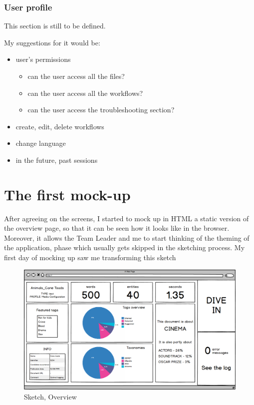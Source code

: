 \documentclass[12pt,svgnames]{memoir}
\begin{document}
\subsubsection*{User profile}\label{user-profile}

This section is still to be defined.

My suggestions for it would be:

\begin{itemize}
\itemsep1pt\parskip0pt
\item
  user's permissions

  \begin{itemize}
  \itemsep1pt\parskip0pt
  \item
    can the user access all the files?
  \item
    can the user access all the workflows?
  \item
    can the user access the troubleshooting section?
  \end{itemize}
\item
  create, edit, delete workflows
\item
  change language
\item
  in the future, past sessions
\end{itemize}

\section{The first mock-up}\label{the-first-mock-up}

After agreeing on the screens, I started to mock up in HTML a static
version of the overview page, so that it can be seen how it looks like
in the browser. Moreover, it allows the Team Leader and me to start
thinking of the theming of the application, phase which usually gets
skipped in the sketching process. My first day of mocking up saw me
transforming this sketch

\begin{figure}[htbp]
\centering
\includegraphics{./src/img/sketch-overview.png}
\caption{Sketch, Overview}
\end{figure}
\end{document}
